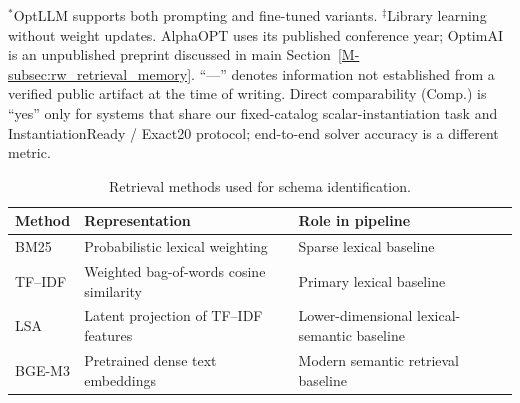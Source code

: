 \documentclass[pdflatex,sn-basic,Numbered]{sn-jnl}
\begin{document}
\begin{table}[htbp]
\vspace{1mm}
\raggedright
\small
$^{*}$OptLLM supports both prompting and fine-tuned variants.
$^{\ddagger}$Library learning without weight updates.
AlphaOPT uses its published conference year; OptimAI is an unpublished preprint discussed in main Section~\ref{M-subsec:rw_retrieval_memory}.
``---'' denotes information not established from a verified public artifact at the time of writing.
Direct comparability (Comp.) is ``yes'' only for systems that share our fixed-catalog scalar-instantiation
task and InstantiationReady / Exact20 protocol; end-to-end solver accuracy is a different metric.
\end{table}
\begin{table}[htbp]
\centering
\caption{Retrieval methods used for schema identification.}
\label{tab:retrieval_backbones}
\small
\begin{tabularx}{\linewidth}{@{}lXX@{}}
\toprule
Method & Representation & Role in pipeline \\
\midrule
BM25 & Probabilistic lexical weighting & Sparse lexical baseline \\
TF--IDF & Weighted bag-of-words cosine similarity & Primary lexical baseline \\
LSA & Latent projection of TF--IDF features & Lower-dimensional lexical-semantic baseline \\
BGE-M3 & Pretrained dense text embeddings & Modern semantic retrieval baseline \\
\bottomrule
\end{tabularx}
\end{table}
\end{document}
